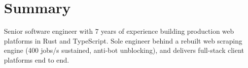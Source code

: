 \section*{Summary}
Senior software engineer with 7 years of experience building production web platforms in Rust and TypeScript. Sole engineer behind a rebuilt web scraping engine (400 jobs/s sustained, anti-bot unblocking), and delivers full-stack client platforms end to end.
